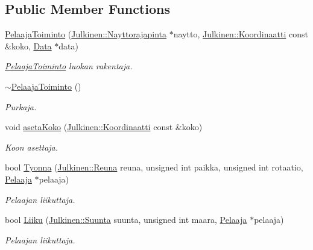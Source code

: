 \subsection*{Public Member Functions}
\begin{DoxyCompactItemize}
\item 
\hyperlink{class_pelaaja_toiminto_af435c652c81b413af351e84e98ca4027}{Pelaaja\+Toiminto} (\hyperlink{class_julkinen_1_1_nayttorajapinta}{Julkinen\+::\+Nayttorajapinta} $\ast$naytto, \hyperlink{class_julkinen_1_1_koordinaatti}{Julkinen\+::\+Koordinaatti} const \&koko, \hyperlink{class_data}{Data} $\ast$data)
\begin{DoxyCompactList}\small\item\em \hyperlink{class_pelaaja_toiminto}{Pelaaja\+Toiminto} luokan rakentaja. \end{DoxyCompactList}\item 
\hyperlink{class_pelaaja_toiminto_a8a27af3770a1fbf0148a75ed51fe3f0e}{$\sim$\+Pelaaja\+Toiminto} ()
\begin{DoxyCompactList}\small\item\em Purkaja. \end{DoxyCompactList}\item 
void \hyperlink{class_pelaaja_toiminto_aa9015f6a8af946a3139eaed1de6555f3}{aseta\+Koko} (\hyperlink{class_julkinen_1_1_koordinaatti}{Julkinen\+::\+Koordinaatti} const \&koko)
\begin{DoxyCompactList}\small\item\em Koon asettaja. \end{DoxyCompactList}\item 
bool \hyperlink{class_pelaaja_toiminto_a59e41355414eabee8fbbb8ebfbe94d64}{Tyonna} (\hyperlink{namespace_julkinen_acce0eefc4c90f907dd5fb319b0d05872}{Julkinen\+::\+Reuna} reuna, unsigned int paikka, unsigned int rotaatio, \hyperlink{class_pelaaja}{Pelaaja} $\ast$pelaaja)
\begin{DoxyCompactList}\small\item\em Pelaajan liikuttaja. \end{DoxyCompactList}\item 
bool \hyperlink{class_pelaaja_toiminto_afd40ede2b643b2e51bb101b1790903b2}{Liiku} (\hyperlink{namespace_julkinen_a81b50e3c6f21c0c1c46e186592107c3c}{Julkinen\+::\+Suunta} suunta, unsigned int maara, \hyperlink{class_pelaaja}{Pelaaja} $\ast$pelaaja)
\begin{DoxyCompactList}\small\item\em Pelaajan liikuttaja. \end{DoxyCompactList}\end{DoxyCompactItemize}


